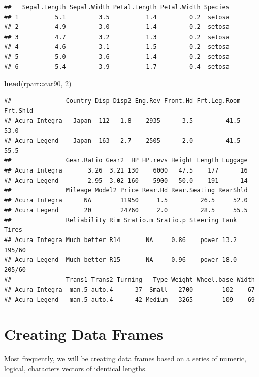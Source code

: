 \documentclass[10pt,b5paper,krantz1]{krantz}
\newenvironment{Shaded}{\begin{snugshade}}{\end{snugshade}}
\newcommand{\DecValTok}[1]{\textcolor[rgb]{0.06,0.06,0.06}{#1}}
\newcommand{\KeywordTok}[1]{\textcolor[rgb]{0.27,0.27,0.27}{\textbf{#1}}}
\newcommand{\NormalTok}[1]{#1}
\newcommand{\OperatorTok}[1]{\textcolor[rgb]{0.43,0.43,0.43}{\textbf{#1}}}
\begin{document}
\begin{verbatim}
##   Sepal.Length Sepal.Width Petal.Length Petal.Width Species
## 1          5.1         3.5          1.4         0.2  setosa
## 2          4.9         3.0          1.4         0.2  setosa
## 3          4.7         3.2          1.3         0.2  setosa
## 4          4.6         3.1          1.5         0.2  setosa
## 5          5.0         3.6          1.4         0.2  setosa
## 6          5.4         3.9          1.7         0.4  setosa
\end{verbatim}

\begin{Shaded}
\begin{Highlighting}[]
\KeywordTok{head}\NormalTok{(rpart}\OperatorTok{::}\NormalTok{car90, }\DecValTok{2}\NormalTok{)}
\end{Highlighting}
\end{Shaded}

\begin{verbatim}
##               Country Disp Disp2 Eng.Rev Front.Hd Frt.Leg.Room Frt.Shld
## Acura Integra   Japan  112   1.8    2935      3.5         41.5     53.0
## Acura Legend    Japan  163   2.7    2505      2.0         41.5     55.5
##               Gear.Ratio Gear2  HP HP.revs Height Length Luggage
## Acura Integra       3.26  3.21 130    6000   47.5    177      16
## Acura Legend        2.95  3.02 160    5900   50.0    191      14
##               Mileage Model2 Price Rear.Hd Rear.Seating RearShld
## Acura Integra      NA        11950     1.5         26.5     52.0
## Acura Legend       20        24760     2.0         28.5     55.5
##               Reliability Rim Sratio.m Sratio.p Steering Tank  Tires
## Acura Integra Much better R14       NA     0.86    power 13.2 195/60
## Acura Legend  Much better R15       NA     0.96    power 18.0 205/60
##               Trans1 Trans2 Turning   Type Weight Wheel.base Width
## Acura Integra  man.5 auto.4      37  Small   2700        102    67
## Acura Legend   man.5 auto.4      42 Medium   3265        109    69
\end{verbatim}

\hypertarget{creating-data-frames}{%
\section{Creating Data Frames}\label{creating-data-frames}}

Most frequently, we will be creating data frames
based on a series of numeric, logical, characters vectors of identical lengths.
\end{document}
